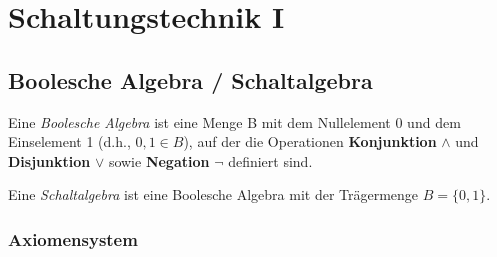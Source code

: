 \documentclass[12pt]{report}
\begin{document}

\tableofcontents

\chapter{Schaltungstechnik I}

\section{Boolesche Algebra / Schaltalgebra}

\begin{defbox}
  Eine \textit{Boolesche Algebra} ist eine Menge B mit dem Nullelement 0 und dem
  Einselement 1 (d.h., $0, 1 \in B$), auf der die Operationen \textbf{Konjunktion} $\wedge$ und  \textbf{Disjunktion} $\vee$ sowie \textbf{Negation} $\neg$ definiert sind.
\end{defbox}

\begin{defbox}[Schaltalgebra]
  Eine \textit{Schaltalgebra} ist eine Boolesche Algebra mit der Trägermenge $B=\{0,1\}$.
\end{defbox}

\subsection{Axiomensystem}
\end{document}
